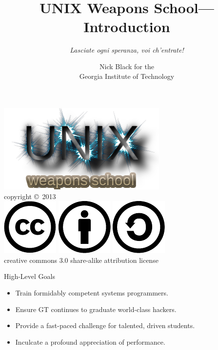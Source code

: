 \documentclass{beamer}
\title{UNIX Weapons School---Introduction}
\subtitle{{\it Lasciate ogni speranza, voi ch'entrate!}}
\date{}
\author{Nick Black for the\\
Georgia Institute of Technology
}
\begin{document}
\begin{frame}
\titlepage
\begin{center}
\includegraphics[scale=0.33]{images/uws.png}\\
\vspace{.1in}
\tiny{copyright \copyright\ 2013}\\
\includegraphics[scale=.25]{images/cc-logo.pdf}
\includegraphics[scale=.25]{images/cc-new.pdf}
\includegraphics[scale=.25]{images/cc-share.pdf}\\
\tiny{creative commons 3.0 share-alike attribution license}
\end{center}
\end{frame}

\begin{frame}{High-Level Goals}
\begin{itemize}
\item Train formidably competent systems programmers.
\item Ensure GT continues to graduate world-class hackers.
\item Provide a fast-paced challenge for talented, driven students. 
\item Inculcate a profound appreciation of performance.
\end{itemize}
\end{frame}
\end{document}
